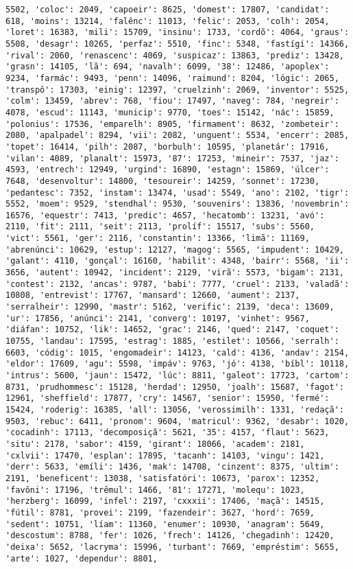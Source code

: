 \begin{Verbatim}[commandchars=\\\{\}]
5502, 'coloc': 2049, 'capoeir': 8625, 'domest': 17807, 'candidat': 618, 'moins': 13214, 'falênc': 11013, 'felic': 2053, 'colh': 2054, 'loret': 16383, 'mili': 15709, 'insinu': 1733, 'cordõ': 4064, 'graus': 5508, 'desagr': 10265, 'perfaz': 5510, 'finc': 5348, 'fastígi': 14366, 'rival': 2060, 'renascenc': 4069, 'suspicaz': 13863, 'prediz': 13428, 'grasn': 14105, 'lã': 694, 'navalh': 6099, '38': 12486, 'apoplex': 9234, 'farmác': 9493, 'penn': 14096, 'raimund': 8204, 'lógic': 2065, 'transpô': 17303, 'einig': 12397, 'cruelzinh': 2069, 'inventor': 5525, 'colm': 13459, 'abrev': 768, 'fiou': 17497, 'naveg': 784, 'negreir': 4078, 'escud': 11143, 'municip': 9770, 'toes': 15142, 'nác': 15859, 'polonius': 17536, 'emparelh': 8905, 'firmament': 8632, 'zombeteir': 2080, 'apalpadel': 8294, 'vii': 2082, 'unguent': 5534, 'encerr': 2085, 'topet': 16414, 'pilh': 2087, 'borbulh': 10595, 'planetár': 17916, 'vilan': 4089, 'planalt': 15973, '87': 17253, 'mineir': 7537, 'jaz': 4593, 'entrech': 12949, 'urgind': 16890, 'estagn': 15869, 'úlcer': 7648, 'desenvoltur': 14800, 'tesoureir': 14259, 'sonnet': 17230, 'pedantesc': 7352, 'instam': 13474, 'usad': 5549, 'ano': 2102, 'tigr': 5552, 'moem': 9529, 'stendhal': 9530, 'souvenirs': 13836, 'novembrin': 16576, 'equestr': 7413, 'predic': 4657, 'hecatomb': 13231, 'avó': 2110, 'fit': 2111, 'seit': 2113, 'prolíf': 15517, 'subs': 5560, 'vict': 5561, 'ger': 2116, 'constantin': 13366, 'limã': 11169, 'abrenúnci': 10629, 'estup': 12127, 'magog': 5565, 'impudent': 10429, 'galant': 4110, 'gonçal': 16160, 'habilit': 4348, 'bairr': 5568, 'ii': 3656, 'autent': 10942, 'incident': 2129, 'virã': 5573, 'bigam': 2131, 'contest': 2132, 'ancas': 9787, 'babi': 7777, 'cruel': 2133, 'valadã': 10808, 'entrevist': 17767, 'mansard': 12660, 'aument': 2137, 'serralheir': 12990, 'mastr': 5162, 'verific': 2139, 'deca': 13609, 'ur': 17856, 'anúnci': 2141, 'converg': 10197, 'vinhet': 9567, 'diáfan': 10752, 'lik': 14652, 'grac': 2146, 'qued': 2147, 'coquet': 10755, 'landau': 17595, 'estrag': 1885, 'estilet': 10566, 'serralh': 6603, 'códig': 1015, 'engomadeir': 14123, 'cald': 4136, 'andav': 2154, 'eldor': 17609, 'agu': 5598, 'impáv': 9763, 'jó': 4138, 'bíbl': 10118, 'intrus': 5600, 'jaun': 15472, 'lúc': 8811, 'galeot': 17723, 'cartom': 8731, 'prudhommesc': 15128, 'herdad': 12950, 'joalh': 15687, 'fagot': 12961, 'sheffield': 17877, 'cry': 14567, 'senior': 15950, 'fermé': 15424, 'roderig': 16385, 'all': 13056, 'verossimilh': 1331, 'redaçã': 9503, 'rebuc': 6411, 'pronom': 9604, 'matricul': 9362, 'desabr': 1020, 'cocadinh': 17113, 'decomposiçã': 5621, '35': 4157, 'flaut': 5623, 'situ': 2178, 'sabor': 4159, 'girant': 18066, 'academ': 2181, 'cxlvii': 17470, 'esplan': 17895, 'tacanh': 14103, 'vingu': 1421, 'derr': 5633, 'emíli': 1436, 'mak': 14708, 'cinzent': 8375, 'ultim': 2191, 'beneficent': 13038, 'satisfatóri': 10673, 'parox': 12352, 'favôni': 17196, 'trêmul': 1466, '81': 17271, 'molequ': 1023, 'herzberg': 16099, 'infel': 2197, 'cxxxii': 17406, 'maçã': 14515, 'fútil': 8781, 'provei': 2199, 'fazendeir': 3627, 'hord': 7659, 'sedent': 10751, 'líam': 11360, 'enumer': 10930, 'anagram': 5649, 'descostum': 8788, 'fer': 1026, 'frech': 14126, 'chegadinh': 12420, 'deixa': 5652, 'lacryma': 15996, 'turbant': 7669, 'empréstim': 5655, 'arte': 1027, 'dependur': 8801, 
\end{Verbatim}
